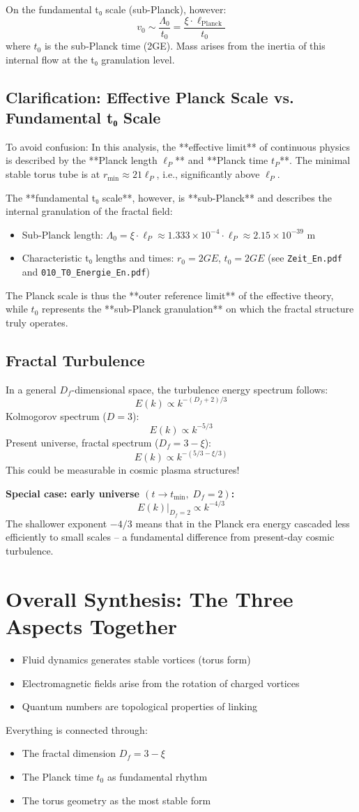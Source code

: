 On the fundamental t₀ scale (sub-Planck), however:
\[
v_0 \sim \frac{\Lambda_0}{t_0} = \frac{\xi \cdot \ell_{\text{Planck}}}{t_0}
\]
where \( t_0 \) is the sub-Planck time (2GE). Mass arises from the inertia of this internal flow at the t₀ granulation level.

\subsection{Clarification: Effective Planck Scale vs. Fundamental t₀ Scale}
To avoid confusion: In this analysis, the **effective limit** of continuous physics is described by the **Planck length \( \ell_P \)** and **Planck time \( t_P \)**. The minimal stable torus tube is at \( r_{\min} \approx 21 \ell_P \), i.e., significantly above \( \ell_P \).

The **fundamental t₀ scale**, however, is **sub-Planck** and describes the internal granulation of the fractal field:
\begin{itemize}
	\item Sub-Planck length: \( \Lambda_0 = \xi \cdot \ell_P \approx 1.333 \times 10^{-4} \cdot \ell_P \approx 2.15 \times 10^{-39} \) m
	\item Characteristic t₀ lengths and times: \( r_0 = 2GE \), \( t_0 = 2GE \) (see \texttt{Zeit\_En.pdf} and \texttt{010\_T0\_Energie\_En.pdf})
\end{itemize}

The Planck scale is thus the **outer reference limit** of the effective theory, while \( t_0 \) represents the **sub-Planck granulation** on which the fractal structure truly operates.

\subsection{Fractal Turbulence}
In a general \(D_f\)-dimensional space, the turbulence energy spectrum follows:
\[
E(k) \propto k^{-(D_f + 2)/3}
\]
Kolmogorov spectrum (\( D = 3 \)):
\[
E(k) \propto k^{-5/3}
\]
Present universe, fractal spectrum (\( D_f = 3 - \xi \)):
\[
E(k) \propto k^{-(5/3 - \xi/3)}
\]
This could be measurable in cosmic plasma structures!

\textbf{Special case: early universe \((t \to t_{\min},\; D_f = 2)\):}
\[
E(k)\big|_{D_f=2} \propto k^{-4/3}
\]
The shallower exponent \(-4/3\) means that in the Planck era energy cascaded less efficiently to small scales -- a fundamental difference from present-day cosmic turbulence.

\section{Overall Synthesis: The Three Aspects Together}
\begin{itemize}
	\item Fluid dynamics generates stable vortices (torus form)
	\item Electromagnetic fields arise from the rotation of charged vortices
	\item Quantum numbers are topological properties of linking
\end{itemize}

Everything is connected through:
\begin{itemize}
	\item The fractal dimension \( D_f = 3 - \xi \)
	\item The Planck time \( t_0 \) as fundamental rhythm
	\item The torus geometry as the most stable form
\end{itemize}
